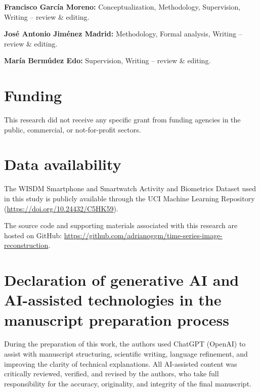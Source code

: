 \documentclass[preprint,12pt]{elsarticle}
\begin{document}
\noindent
\textbf{Francisco García Moreno:}
Conceptualization, Methodology, Supervision,
Writing -- review \& editing.

\noindent
\textbf{José Antonio Jiménez Madrid:}
Methodology, Formal analysis,
Writing -- review \& editing.

\noindent
\textbf{María Bermúdez Edo:}
Supervision, Writing -- review \& editing.
\section*{Funding}

This research did not receive any specific grant
from funding agencies in the public, commercial,
or not-for-profit sectors.


\section*{Data availability}

The WISDM Smartphone and Smartwatch Activity and
Biometrics Dataset used in this study is publicly
available through the UCI Machine Learning Repository
(\url{https://doi.org/10.24432/C5HK59}).

The source code and supporting materials associated
with this research are hosted on GitHub:
\url{https://github.com/adrianoggm/time-series-image-reconstruction}.

\section*{Declaration of generative AI and AI-assisted
technologies in the manuscript preparation process}

During the preparation of this work, the authors used
ChatGPT (OpenAI) to assist with manuscript structuring,
scientific writing, language refinement, and improving
the clarity of technical explanations. All AI-assisted
content was critically reviewed, verified, and revised
by the authors, who take full responsibility for the
accuracy, originality, and integrity of the final
manuscript.
\end{document}
